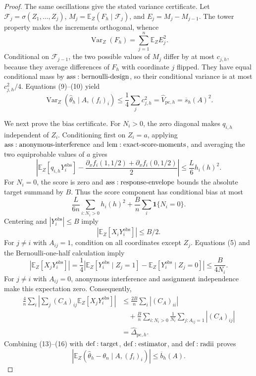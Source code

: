\documentclass{article}
\begin{document}
\begin{proof}
The same oscillations give the stated variance certificate.  Let \(\mathcal F_j=\sigma(Z_1,\ldots,Z_j)\), \(M_j=\mathbb E_Z(F_h\mid\mathcal F_j)\), and \(E_j=M_j-M_{j-1}\).  The tower property makes the increments orthogonal, whence
\[
 \operatorname{Var}_Z(F_h)=\sum_{j=1}^n\mathbb E_ZE_j^2.
\tag{10}
\]
Conditional on \(\mathcal F_{j-1}\), the two possible values of \(M_j\) differ by at most \(c_{j,h}\), because they average differences of \(F_h\) with coordinate \(j\) flipped.  They have equal conditional mass by \({\rm ass:bernoulli\text{-}design}\), so their conditional variance is at most \(c_{j,h}^2/4\).  Equations (9)--(10) yield
\[
 \operatorname{Var}_Z(\widehat\theta_h\mid A,(f_i)_i)
 \leq\frac14\sum_jc_{j,h}^2
 =\widehat V_{\mathrm{pc},h}=\overline s_h(A)^2.
\tag{11}
\]

We next prove the bias certificate.  For \(N_i>0\), the zero diagonal makes \(q_{i,h}\) independent of \(Z_i\).  Conditioning first on \(Z_i=a\), applying \({\rm ass:anonymous\text{-}interference}\) and \({\rm lem:exact\text{-}score\text{-}moments}\), and averaging the two equiprobable values of \(a\) gives
\[
 \left|\mathbb E_Z[q_{i,h}Y_i^{\mathrm{obs}}]
 -\frac{\partial_xf_i(1,1/2)+\partial_xf_i(0,1/2)}2\right|
 \leq\frac L6h_i(h)^2.
\tag{12}
\]
For \(N_i=0\), the score is zero and \({\rm ass:response\text{-}envelope}\) bounds the absolute target summand by \(B\).  Thus the score component has conditional bias at most
\[
 \frac{L}{6n}\sum_{i:N_i>0}h_i(h)^2
 +\frac Bn\sum_i\mathbf1\{N_i=0\}.
\tag{13}
\]
Centering and \(|Y_i^{\mathrm{obs}}|\leq B\) imply
\[
 |\mathbb E_Z[X_iY_i^{\mathrm{obs}}]|\leq B/2.
\tag{14}
\]
For \(j\ne i\) with \(A_{ij}=1\), condition on all coordinates except \(Z_j\).  Equations (5) and the Bernoulli-one-half calculation imply
\[
 |\mathbb E_Z[X_jY_i^{\mathrm{obs}}]|
 =\frac14\left|\mathbb E_Z[Y_i^{\mathrm{obs}}\mid Z_j=1]
 -\mathbb E_Z[Y_i^{\mathrm{obs}}\mid Z_j=0]\right|
 \leq\frac B{4N_i}.
\tag{15}
\]
For \(j\ne i\) with \(A_{ij}=0\), anonymous interference and assignment independence make this expectation zero.  Consequently,
\[
\begin{aligned}
 \frac4n\sum_i\left|\sum_j(C_A)_{ij}\mathbb E_Z[X_jY_i^{\mathrm{obs}}]\right|
 &\leq\frac{2B}{n}\sum_i|(C_A)_{ii}|\\
 &\quad+\frac Bn\sum_{i:N_i>0}\frac1{N_i}
       \sum_{j:A_{ij}=1}|(C_A)_{ij}|\\
 &=\widehat\Delta_{\mathrm{pc},h}.
\end{aligned}
\tag{16}
\]
Combining (13)--(16) with \({\rm def:target}\), \({\rm def:estimator}\), and \({\rm def:radii}\) proves
\[
 \left|\mathbb E_Z(\widehat\theta_h-\theta_n\mid A,(f_i)_i)\right|
 \leq\overline b_h(A).
\tag{17}
\]


\end{proof}
\end{document}
